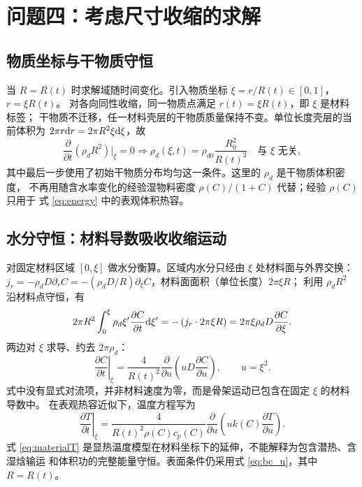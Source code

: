 \documentclass[withoutpreface,bwprint]{cumcmthesis}
\begin{document}
\section{问题四：考虑尺寸收缩的求解}
\label{sec:shrink}

\subsection{物质坐标与干物质守恒}

当 $R=R(t)$ 时求解域随时间变化。引入物质坐标 $\xi=r/R(t)\in[0,1]$，$r=\xi R(t)$。
对各向同性收缩，同一物质点满足 $r(t)=\xi R(t)$，即 $\xi$ 是材料标签；
干物质不迁移，任一材料壳层的干物质质量保持不变。单位长度壳层的当前体积为
$2\pi r{\rm d}r=2\pi R^2\xi{\rm d}\xi$，故
\[
\frac{\partial}{\partial t}\left(\rho_dR^2\right)\Big|_\xi=0
\Longrightarrow
\rho_d(\xi,t)=\rho_{d0}\frac{R_0^2}{R(t)^2}\quad\text{与 }\xi\text{ 无关},
\]
其中最后一步使用了初始干物质分布均匀这一条件。这里的 $\rho_d$ 是干物质体积密度，
不再用随含水率变化的经验湿物料密度 $\rho(C)/(1+C)$ 代替；经验 $\rho(C)$ 只用于
式 \eqref{eq:energy} 中的表观体积热容。

\subsection{水分守恒：材料导数吸收收缩运动}

对固定材料区域 $[0,\xi]$ 做水分衡算。区域内水分只经由 $\xi$ 处材料面与外界交换：
$j_r=-\rho_dD\partial_rC=-(\rho_dD/R)\partial_\xi C$，材料面面积（单位长度）$2\pi\xi R$；
利用 $\rho_dR^2$ 沿材料点守恒，有
\[
2\pi R^2\int_0^\xi\rho_d\xi'\frac{\partial C}{\partial t}{\rm d}\xi'
=-\left(j_r\cdot2\pi\xi R\right)=2\pi\xi\rho_dD\frac{\partial C}{\partial\xi}.
\]
两边对 $\xi$ 求导、约去 $2\pi\rho_d$：
\begin{equation}
\boxed{\;\left.\frac{\partial C}{\partial t}\right|_\xi
=\frac{4}{R(t)^2}\frac{\partial}{\partial u}\left(uD\frac{\partial C}{\partial u}\right),
\qquad u=\xi^2 .\;}
\label{eq:material}
\end{equation}
式中没有显式对流项，并非材料速度为零，而是骨架运动已包含在固定 $\xi$ 的材料导数中。
在表观热容近似下，温度方程写为
\begin{equation}
\boxed{\;\left.\frac{\partial T}{\partial t}\right|_\xi
=\frac{4}{R(t)^2\rho(C)c_p(C)}
\frac{\partial}{\partial u}\left(uk(C)\frac{\partial T}{\partial u}\right).\;}
\label{eq:materialT}
\end{equation}
式 \eqref{eq:materialT} 是显热温度模型在材料坐标下的延伸，不能解释为包含潜热、含湿焓输运
和体积功的完整能量守恒。表面条件仍采用式 \eqref{eq:bc_u}，其中 $R=R(t)$。
\end{document}
